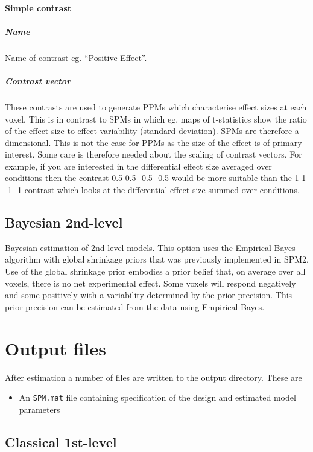 \paragraph{Simple contrast}

\subparagraph{Name}
Name of contrast eg. ``Positive Effect''.

\subparagraph{Contrast vector}
These contrasts are used to generate PPMs which characterise effect sizes at each voxel. This is in contrast to SPMs in which eg. maps of t-statistics show the ratio of the effect size to effect variability (standard deviation). SPMs are therefore a-dimensional. This is not the case for PPMs as the size of the effect is of primary interest. Some care is therefore needed about the scaling of contrast vectors. For example, if you are interested in the differential effect size averaged over conditions then the contrast 0.5 0.5 -0.5 -0.5 would be more suitable than the 1 1 -1 -1 contrast which looks at the differential effect size summed over conditions.

\subsection{Bayesian 2nd-level}

Bayesian estimation of 2nd level models. This option uses the Empirical Bayes algorithm with global shrinkage priors that was previously implemented in SPM2. Use of the global shrinkage prior embodies a prior belief that, on average over all voxels, there is no net experimental effect. Some voxels will respond negatively and some positively with a variability determined by the prior precision. This prior precision can be estimated from the data using Empirical Bayes.

\section{Output files}

After estimation a number of files are written to the output directory. These are

\begin{itemize}
\item{An \verb!SPM.mat! file containing specification of the design and estimated model parameters}
\end{itemize}

\subsection{Classical 1st-level}


